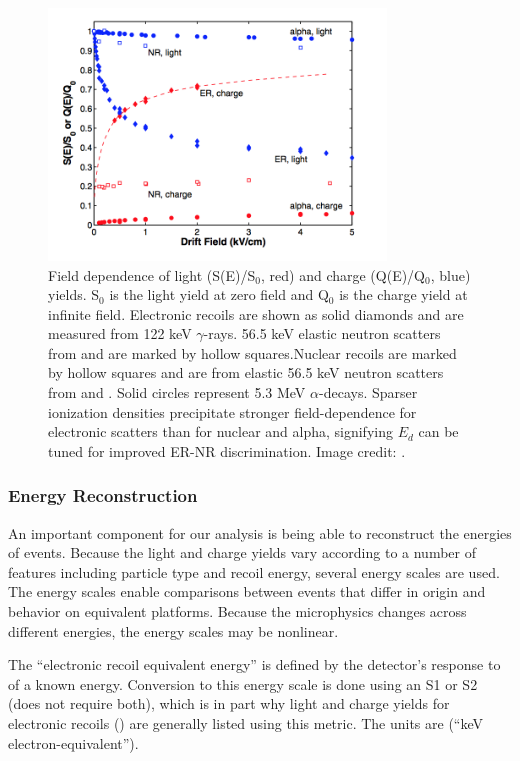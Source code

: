 \begin{figure}
\centering
\includegraphics[width=0.8\textwidth]{LYQY}
\caption{Field dependence of light (S(E)/S$_{0}$, red) and charge (Q(E)/Q$_{0}$, blue) yields.  S$_{0}$ is the light yield at zero field
and Q$_{0}$ is the charge yield at
infinite field.  Electronic recoils are shown as solid diamonds and are measured from  122 keV $\gamma$-rays.  56.5
keV elastic neutron scatters from \ambe and  are marked by hollow squares.Nuclear recoils
are marked by hollow squares and are from elastic 56.5 keV neutron scatters from \ambe and .  Solid circles represent 
5.3 MeV $\alpha$-decays.  Sparser ionization densities precipitate stronger field-dependence for electronic scatters than for nuclear and
alpha, signifying $E_{d}$ can be tuned for improved ER-NR discrimination.  Image credit: .}
\label{fig:tpcs_signals_drift_field}
\end{figure}



\subsubsection{Energy Reconstruction}
\label{subsubsec:tpcs_signals_energy}
An important component for our analysis is being able to reconstruct the energies of events.  Because the light and charge yields vary
according to a number of features including particle type and recoil energy, several energy scales are used.  The energy scales enable
comparisons between events that differ in origin and behavior on equivalent platforms.  Because the microphysics changes across different
energies, the energy scales may be nonlinear.

The ``electronic recoil equivalent energy'' is defined by the detector's response to \gammarays of a known energy.  Conversion to this
energy
scale is done using an S1 or S2 (does not require both), which is in
part why light and charge yields for electronic recoils () are generally listed using this
metric.  The units are \kevee (``keV electron-equivalent'').

